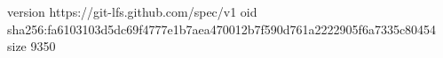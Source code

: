 version https://git-lfs.github.com/spec/v1
oid sha256:fa6103103d5dc69f4777e1b7aea470012b7f590d761a2222905f6a7335c80454
size 9350
